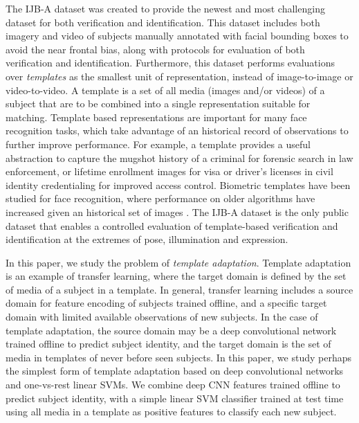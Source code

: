 \documentclass[10pt,twocolumn,letterpaper]{article}
\theoremstyle{definition}		\newtheorem{defn}[thm]{Definition}
\begin{document}
The IJB-A dataset \cite{Klare15} was created to provide the newest and most challenging dataset for both verification and identification.  This dataset includes both imagery and video of subjects manually annotated with facial bounding boxes to avoid the near frontal bias, along with protocols for evaluation of both verification and identification.  Furthermore, this dataset performs evaluations over {\em templates} \cite{Grother14} as the smallest unit of representation, instead of image-to-image or video-to-video.  A template is a set of all media (images and/or videos) of a subject that are to be combined into a single representation suitable for matching.  Template based representations are important for many face recognition tasks, which take advantage of an historical record of observations to further improve performance. For example, a template provides a useful abstraction to capture the mugshot history of a criminal for forensic search in law enforcement, or lifetime enrollment images for visa or driver's licenses in civil identity credentialing for improved access control.  Biometric templates have been studied for face recognition, where performance on older algorithms have increased given an historical set of images \cite{Grother14}. The IJB-A dataset is the only public dataset that enables a controlled evaluation of template-based verification and identification at the extremes of pose, illumination and expression.  


In this paper, we study the problem of {\em template adaptation}.  Template adaptation is an example of transfer learning, where the target domain is defined by the set of media of a subject in a template.  In general, transfer learning includes a source domain for feature encoding of subjects trained offline, and a specific target domain with limited available observations of new subjects.  In the case of template adaptation, the source domain may be a deep convolutional network trained offline to predict subject identity, and the target domain is the set of media in templates of never before seen subjects.  In this paper, we study perhaps the simplest form of template adaptation based on deep convolutional networks and one-vs-rest linear SVMs.  We combine deep CNN features trained offline to predict subject identity, with a simple linear SVM classifier trained at test time using all media in a template as positive features to classify each new subject.  
\end{document}
